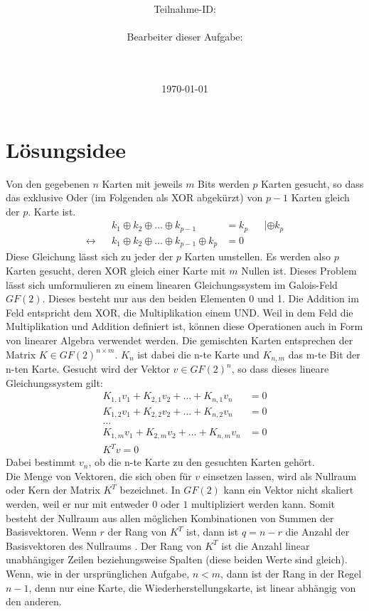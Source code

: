 \documentclass[a4paper,10pt,ngerman]{scrartcl}
\title{\textbf{\Huge\Aufgabe}}
\author{\LARGE Teilnahme-ID: \LARGE \TeamId \\\\
	    \LARGE Bearbeiter dieser Aufgabe: \\ 
	    \LARGE \Namen\\\\}
\date{\LARGE\today}
\newcommand*\xor{\oplus}
\begin{document}
\maketitle
\tableofcontents

\vspace{0.5cm}



\section{Lösungsidee}
Von den gegebenen $n$ Karten mit jeweils $m$ Bits werden $p$ Karten gesucht, so dass das exklusive Oder (im Folgenden als XOR abgekürzt) von $p-1$ Karten gleich der $p.$ Karte ist.
\begin{align*}
&& k_1 \xor k_2 \xor \ldots \xor k_{p-1} &= k_p && |\xor k_p \\
\leftrightarrow && k_1 \xor k_2 \xor \ldots \xor k_{p-1} \xor k_p &= 0 &&
\end{align*}
Diese Gleichung lässt sich zu jeder der $p$ Karten umstellen. Es werden also $p$ Karten gesucht, deren XOR gleich einer Karte mit $m$ Nullen ist. Dieses Problem lässt sich umformulieren zu einem linearen Gleichungssystem im Galois-Feld $GF(2)$. Dieses besteht nur aus den beiden Elementen 0 und 1. Die Addition im Feld entspricht dem XOR, die Multiplikation einem UND. Weil in dem Feld die Multiplikation und Addition definiert ist, können diese Operationen auch in Form von linearer Algebra verwendet werden. Die gemischten Karten entsprechen der Matrix $K \in GF(2)^{n \times m}$. $K_n$ ist dabei die n-te Karte und $K_{n,m}$ das m-te Bit der n-ten Karte. Gesucht wird der Vektor $v \in GF(2)^n$, so dass dieses lineare Gleichungssystem gilt:
\begin{align*}
K_{1, 1} v_1 + K_{2, 1} v_2 + \ldots + K_{n, 1} v_n &= 0 \\
K_{1, 2} v_1 + K_{2, 2} v_2 + \ldots + K_{n, 2} v_n &= 0 \\
\ldots \\
K_{1, m} v_1 + K_{2, m} v_2 + \ldots + K_{n, m} v_n &= 0 \\ 
K^T v = 0
\end{align*}
Dabei bestimmt $v_n$, ob die n-te Karte zu den gesuchten Karten gehört. \\
Die Menge von Vektoren, die sich oben für $v$ einsetzen lassen, wird als Nullraum oder Kern der Matrix $K^T$ bezeichnet. In $GF(2)$ kann ein Vektor nicht skaliert werden, weil er nur mit entweder $0$ oder $1$ multipliziert werden kann. Somit besteht der Nullraum aus allen möglichen Kombinationen von Summen der Basisvektoren. Wenn $r$ der Rang von $K^T$ ist, dann ist $q=n-r$ die Anzahl der Basisvektoren des Nullraums \cite[S. 63]{Axler2014}. Der Rang von $K^T$ ist die Anzahl linear unabhängiger Zeilen beziehungsweise Spalten (diese beiden Werte sind gleich). Wenn, wie in der ursprünglichen Aufgabe, $n<m$, dann ist der Rang in der Regel $n-1$, denn nur eine Karte, die Wiederherstellungskarte, ist linear abhängig von den anderen. \\
\end{document}
